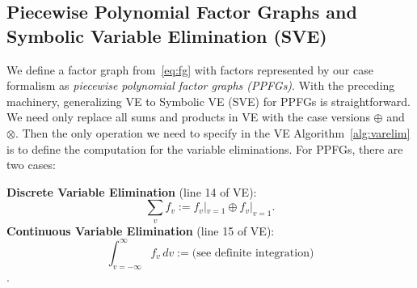 \documentclass[letterpaper]{article}
\newtheorem{restr}{Restriction}   %
\newcommand{\var}{v}
\renewcommand{\vec}[1]{\mathbf{#1}}
\begin{document}
{%





%


\subsection{Piecewise Polynomial Factor Graphs and Symbolic Variable Elimination (SVE)}

We define a factor graph from~\eqref{eq:fg} with factors represented
by our case formalism as \emph{piecewise polynomial factor graphs
(PPFGs)}.  
With the preceding machinery, generalizing VE to Symbolic VE (SVE) for
PPFGs is straightforward.  We need only replace all sums and products
in VE with the case versions $\oplus$ and $\otimes$.  Then the only
operation we need to specify in the VE Algorithm~\ref{alg:varelim} is
to define the computation for the variable
eliminations.  For PPFGs, there are two cases:

\vspace{2mm}
{\bf Discrete Variable Elimination} (line 14 of VE):\\
\vspace{-3mm}
$$\sum_v f_v := f_v|_{v=1} \oplus f_v|_{v=1}.$$
\vspace{-2mm}
{\bf Continuous Variable Elimination} (line 15 of VE):\\ 
$$\int_{\var=-\infty}^{\infty} f_\var \, d\var := \mbox{(see definite integration)}$$.

}
\end{document}

